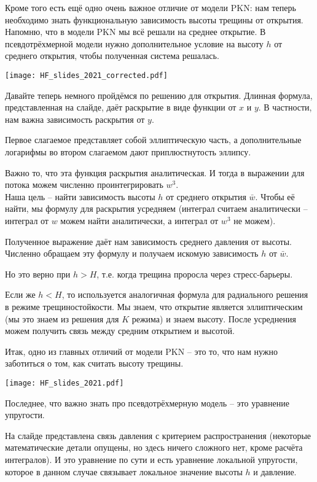 \documentclass[main.tex]{subfiles}
\begin{document}
Кроме того есть ещё одно очень важное отличие от модели PKN: нам теперь необходимо знать функциональную зависимость высоты трещины от открытия.
Напомню, что в модели PKN мы всё решали на среднее открытие.
В псевдотрёхмерной модели нужно дополнительное условие на высоту $h$ от среднего открытия, чтобы полученная система решалась.

\texttt{[image: HF\_slides\_2021\_corrected.pdf]}

Давайте теперь немного пройдёмся по решению для открытия.
Длинная формула, представленная на слайде, даёт раскрытие в виде функции от $x$ и $y$.
В частности, нам важна зависимость раскрытия от $y$.

Первое слагаемое представляет собой эллиптическую часть, а дополнительные логарифмы во втором слагаемом дают приплюстнутость эллипсу.

Важно то, что эта функция раскрытия аналитическая.
И тогда в выражении для потока можем численно проинтегрировать $w^3$.
\\

Наша цель -- найти зависимость высоты $h$ от среднего открытия $\bar{w}$.
Чтобы её найти, мы формулу для раскрытия усредняем (интеграл считаем аналитически -- интеграл от $w$ можем найти аналитически, а интеграл от $w^3$ не можем).


Полученное выражение даёт нам зависимость среднего давления от высоты.
Численно обращаем эту формулу и получаем искомую зависимость $h$ от $\bar{w}$.

Но это верно при $h>H$, т.е. когда трещина проросла через стресс-барьеры.

Если же $h<H$, то используется аналогичная формула для радиального решения в режиме трещиностойкости.
Мы знаем, что открытие является эллиптическим (мы это знаем из решения для $K$ режима) и знаем высоту.
После усреднения можем получить связь между средним открытием и высотой.

Итак, одно из главных отличий от модели PKN -- это то, что нам нужно заботиться о том, как считать высоту трещины. 

\texttt{[image: HF\_slides\_2021.pdf]}

Последнее, что важно знать про псевдотрёхмерную модель -- это уравнение упругости.

На слайде представлена связь давления с критерием распространения (некоторые математические детали опущены, но здесь ничего сложного нет, кроме расчёта интегралов).
И это уравнение по сути и есть уравнение локальной упругости, которое в данном случае связывает локальное значение высоты $h$ и давление.
\\
\end{document}
